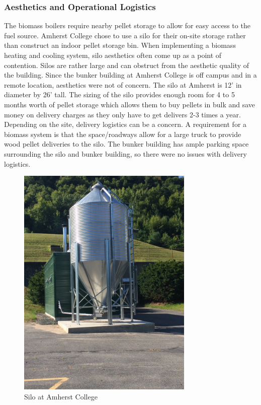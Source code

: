 \subsubsection{Aesthetics and Operational Logistics}
\par The biomass boilers require nearby pellet storage to allow for easy access to the fuel source. Amherst College chose to use a silo for their on-site storage rather than construct an indoor pellet storage bin. When implementing a biomass heating and cooling system, silo aesthetics often come up as a point of contention. Silos are rather large and can obstruct from the aesthetic quality of the building. Since the bunker building at Amherst College is off campus and in a remote location, aesthetics were not of concern. The silo at Amherst is 12’ in diameter by 26’ tall. The sizing of the silo provides enough room for 4 to 5 months worth of pellet storage which allows them to buy pellets in bulk and save money on delivery charges as they only have to get delivers 2-3 times a year. Depending on the site, delivery logistics can be a concern. A requirement for a biomass system is that the space/roadways allow for a large truck to provide wood pellet deliveries to the silo. The bunker building has ample parking space surrounding the silo and bunker building, so there were no issues with delivery logistics.
\begin{figure}[H]
\centering
\includegraphics[width=0.75\textwidth, angle=-90]{findingschapter/amherstsilo}
\caption{Silo at Amherst College}
\end{figure}

